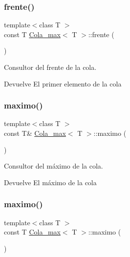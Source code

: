 \subsubsection{\texorpdfstring{frente()}{frente()}\hspace{0.1cm}{\footnotesize\ttfamily [2/2]}}
{\footnotesize\ttfamily template$<$class T $>$ \\
const T \hyperlink{classCola__max}{Cola\+\_\+max}$<$ T $>$\+::frente (\begin{DoxyParamCaption}{ }\end{DoxyParamCaption})}



Consultor del frente de la cola. 

\begin{DoxyReturn}{Devuelve}
El primer elemento de la cola 
\end{DoxyReturn}
\mbox{\label{classCola__max_ae1a93314e01ae1587b0e14fd768da476}} 
\subsubsection{\texorpdfstring{maximo()}{maximo()}\hspace{0.1cm}{\footnotesize\ttfamily [1/2]}}
{\footnotesize\ttfamily template$<$class T $>$ \\
const T\& \hyperlink{classCola__max}{Cola\+\_\+max}$<$ T $>$\+::maximo (\begin{DoxyParamCaption}{ }\end{DoxyParamCaption})}



Consultor del máximo de la cola. 

\begin{DoxyReturn}{Devuelve}
El máximo de la cola 
\end{DoxyReturn}
\mbox{\label{classCola__max_ad5745cfed3c1d4dc1cceef84c07096b0}} 
\subsubsection{\texorpdfstring{maximo()}{maximo()}\hspace{0.1cm}{\footnotesize\ttfamily [2/2]}}
{\footnotesize\ttfamily template$<$class T $>$ \\
const T \hyperlink{classCola__max}{Cola\+\_\+max}$<$ T $>$\+::maximo (\begin{DoxyParamCaption}{ }\end{DoxyParamCaption})}



